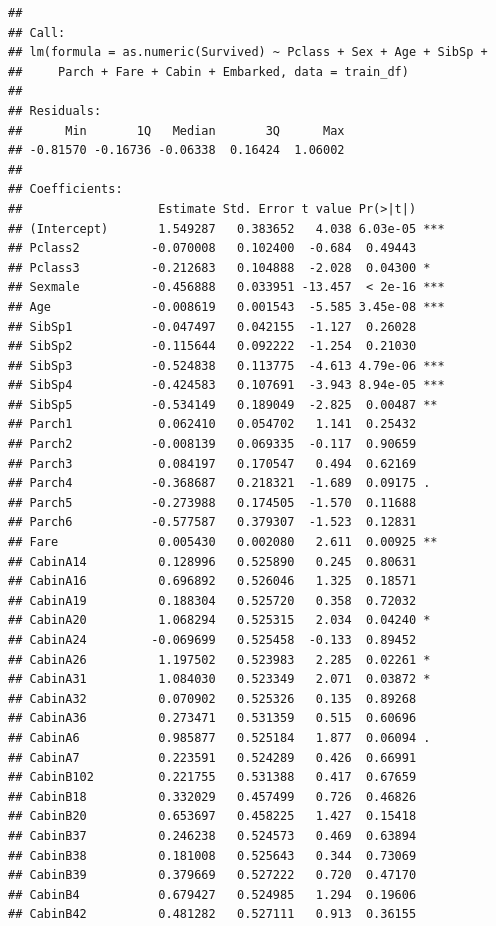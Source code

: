 \documentclass[]{article}
\begin{document}
\begin{verbatim}
## 
## Call:
## lm(formula = as.numeric(Survived) ~ Pclass + Sex + Age + SibSp + 
##     Parch + Fare + Cabin + Embarked, data = train_df)
## 
## Residuals:
##      Min       1Q   Median       3Q      Max 
## -0.81570 -0.16736 -0.06338  0.16424  1.06002 
## 
## Coefficients:
##                   Estimate Std. Error t value Pr(>|t|)    
## (Intercept)       1.549287   0.383652   4.038 6.03e-05 ***
## Pclass2          -0.070008   0.102400  -0.684  0.49443    
## Pclass3          -0.212683   0.104888  -2.028  0.04300 *  
## Sexmale          -0.456888   0.033951 -13.457  < 2e-16 ***
## Age              -0.008619   0.001543  -5.585 3.45e-08 ***
## SibSp1           -0.047497   0.042155  -1.127  0.26028    
## SibSp2           -0.115644   0.092222  -1.254  0.21030    
## SibSp3           -0.524838   0.113775  -4.613 4.79e-06 ***
## SibSp4           -0.424583   0.107691  -3.943 8.94e-05 ***
## SibSp5           -0.534149   0.189049  -2.825  0.00487 ** 
## Parch1            0.062410   0.054702   1.141  0.25432    
## Parch2           -0.008139   0.069335  -0.117  0.90659    
## Parch3            0.084197   0.170547   0.494  0.62169    
## Parch4           -0.368687   0.218321  -1.689  0.09175 .  
## Parch5           -0.273988   0.174505  -1.570  0.11688    
## Parch6           -0.577587   0.379307  -1.523  0.12831    
## Fare              0.005430   0.002080   2.611  0.00925 ** 
## CabinA14          0.128996   0.525890   0.245  0.80631    
## CabinA16          0.696892   0.526046   1.325  0.18571    
## CabinA19          0.188304   0.525720   0.358  0.72032    
## CabinA20          1.068294   0.525315   2.034  0.04240 *  
## CabinA24         -0.069699   0.525458  -0.133  0.89452    
## CabinA26          1.197502   0.523983   2.285  0.02261 *  
## CabinA31          1.084030   0.523349   2.071  0.03872 *  
## CabinA32          0.070902   0.525326   0.135  0.89268    
## CabinA36          0.273471   0.531359   0.515  0.60696    
## CabinA6           0.985877   0.525184   1.877  0.06094 .  
## CabinA7           0.223591   0.524289   0.426  0.66991    
## CabinB102         0.221755   0.531388   0.417  0.67659    
## CabinB18          0.332029   0.457499   0.726  0.46826    
## CabinB20          0.653697   0.458225   1.427  0.15418    
## CabinB37          0.246238   0.524573   0.469  0.63894    
## CabinB38          0.181008   0.525643   0.344  0.73069    
## CabinB39          0.379669   0.527222   0.720  0.47170    
## CabinB4           0.679427   0.524985   1.294  0.19606    
## CabinB42          0.481282   0.527111   0.913  0.36155    

\end{verbatim}
\end{document}

